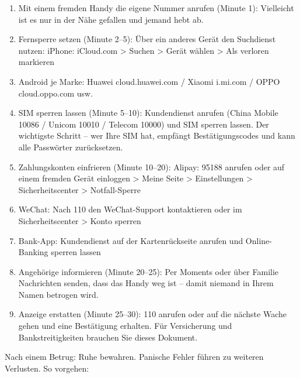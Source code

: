 \begin{enumerate}
  \item Mit einem fremden Handy die eigene Nummer anrufen (Minute 1): Vielleicht ist es nur in der Nähe gefallen und jemand hebt ab.
  \item Fernsperre setzen (Minute 2–5): Über ein anderes Gerät den Suchdienst nutzen: iPhone: iCloud.com > Suchen > Gerät wählen > Als verloren markieren
  \item Android je Marke: Huawei cloud.huawei.com / Xiaomi i.mi.com / OPPO cloud.oppo.com usw.
  \item SIM sperren lassen (Minute 5–10): Kundendienst anrufen (China Mobile 10086 / Unicom 10010 / Telecom 10000) und SIM sperren lassen. Der wichtigste Schritt – wer Ihre SIM hat, empfängt Bestätigungscodes und kann alle Passwörter zurücksetzen.
  \item Zahlungskonten einfrieren (Minute 10–20): Alipay: 95188 anrufen oder auf einem fremden Gerät einloggen > Meine Seite > Einstellungen > Sicherheitscenter > Notfall-Sperre
  \item WeChat: Nach 110 den WeChat-Support kontaktieren oder im Sicherheitscenter > Konto sperren
  \item Bank-App: Kundendienst auf der Kartenrückseite anrufen und Online-Banking sperren lassen
  \item Angehörige informieren (Minute 20–25): Per Moments oder über Familie Nachrichten senden, dass das Handy weg ist – damit niemand in Ihrem Namen betrogen wird.
  \item Anzeige erstatten (Minute 25–30): 110 anrufen oder auf die nächste Wache gehen und eine Bestätigung erhalten. Für Versicherung und Bankstreitigkeiten brauchen Sie dieses Dokument.
\end{enumerate}


Nach einem Betrug: Ruhe bewahren. Panische Fehler führen zu weiteren Verlusten. So vorgehen:

